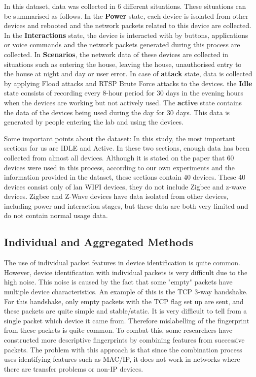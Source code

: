 \documentclass[journal]{IEEEtran}
\begin{document}
In this dataset, data was collected in 6 different situations. These situations can be summarised as follows. 
In the \textbf{Power} state, each device is isolated from other devices and rebooted and the network packets related to this device are collected.
In the \textbf{Interactions} state, the device is interacted with by buttons, applications or voice commands and the network packets generated during this process are collected.
In \textbf{Scenarios}, the network data of these devices are collected in situations such as entering the house, leaving the house, unauthorised entry to the house at night and day or user error. 
In case of \textbf{attack} state, data is collected by applying Flood attacks and RTSP Brute Force attacks to the devices.
the \textbf{Idle} state consists of recording every 8-hour period for 30 days in the evening hours when the devices are working but not actively used.
The \textbf{active} state contains the data of the devices being used during the day for 30 days. This data is generated by people entering the lab and using the devices.

Some important points about the dataset:
In this study, the most important sections for us are IDLE and Active. In these two sections, enough data has been collected from almost all devices. Although it is stated on the paper that 60 devices were used in this process, according to our own experiments and the information provided in the dataset, these sections contain 40 devices. These 40 devices consist only of lan WIFI devices, they do not include Zigbee and z-wave devices. Zigbee and Z-Wave devices have data isolated from other devices, including power  and interaction stages, but these data are both very limited and do not contain normal usage data.


\subsection{Individual and Aggregated  Methods}
The use of individual packet features in device identification is quite common\cite{kostas2022IoTDevID,miettinen2017iot,CIC,aksoy2019automated,bezawada2018behavioral}. However, device identification with individual packets is very difficult due to the high noise.  This noise is caused by the fact that some "empty" packets have multiple device characteristics. An example of this is the TCP  3-way handshake. For this handshake, only empty packets with the TCP flag set up are sent, and these packets are quite simple and stable/static. It is very difficult to tell from a single packet which device it came from. Therefore mislabelling of the fingerprint from these packets is quite common.  To combat this, some researchers\cite{miettinen2017iot,bezawada2018behavioral} have constructed more descriptive fingerprints by combining features from successive packets. The problem with this approach is that since the combination process uses identifying features such as MAC/IP, it does not work in networks where there are transfer problems or non-IP devices.
\end{document}
